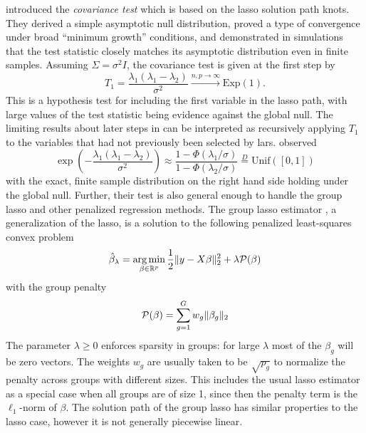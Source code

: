 \documentclass[oupdraft]{bio}
\def\real{{\mathbb R}}
\DeclareMathOperator*{\argmin}{arg\,min}
\begin{document}
\cite{significance:lasso} introduced the \emph{covariance test} which
is based on the lasso solution path knots. They derived a simple
asymptotic null distribution, proved a type of convergence under broad
``minimum growth'' conditions, and demonstrated in simulations that
the test statistic closely matches its asymptotic distribution even in
finite samples. Assuming $\Sigma = \sigma^2 I$, the covariance test is
given at the first step by
\begin{equation}
\label{eq:covtest}
T_1 = \frac{\lambda_1(\lambda_1-\lambda_2)}{\sigma^2} \overset{n,p \to \infty}{\to} \text{Exp}(1).
\end{equation}
This is a hypothesis test for including the first variable in the lasso
path, with large values of the test statistic being evidence against the
global null. 
The limiting results about later steps in \cite{significance:lasso} can be interpreted as recursively applying $T_1$ to the variables that had not previously been selected by lars.
\cite{tests:adaptive} observed
\begin{equation}
\label{test:exact}
\exp\left(- \frac{\lambda_1(\lambda_1-\lambda_2)}{\sigma^2} \right)
\approx
\frac{1 - \Phi(\lambda_1/\sigma)}{1 - \Phi(\lambda_2 / \sigma)} \overset{D}{=} \text{Unif}([0,1])
\end{equation}
with the exact, finite sample distribution on the right hand side holding
under the global null.
Further, their test is also general enough to handle the group lasso and other penalized regression methods. The group lasso estimator \citep{bakin:grouplasso,grouplasso}, a generalization of the lasso, is a solution to the following penalized least-squares convex problem
\begin{equation}
\begin{aligned}
\label{eq:gsoln}
\displaystyle \hat \beta_\lambda = \argmin_{\beta \in \real^p} \frac{1}{2} \| y - X \beta \|_2^2 +
   \lambda {\cal P}(\beta) \\
\end{aligned}
\end{equation}
with the group penalty
\begin{equation}
  \begin{aligned}
  \label{eq:gpen}
    {\cal P}(\beta)&= \sum_{g=1}^G w_g \| \beta_g \|_2 \\
  \end{aligned}
\end{equation}
The parameter $\lambda \geq 0$ enforces sparsity in groups: for large
$\lambda$ most of the $\beta_g$ will be zero vectors. The weights
$w_g$ are usually taken to be $\sqrt {p_g}$ to normalize the penalty
across groups with different sizes.
This includes the usual lasso estimator as a
special case when all groups are of size 1, since then the
penalty term is the $\ell_1$-norm of $\beta$. The solution path of the group
lasso has similar properties to the lasso case, however it is not
generally piecewise linear.
\end{document}

